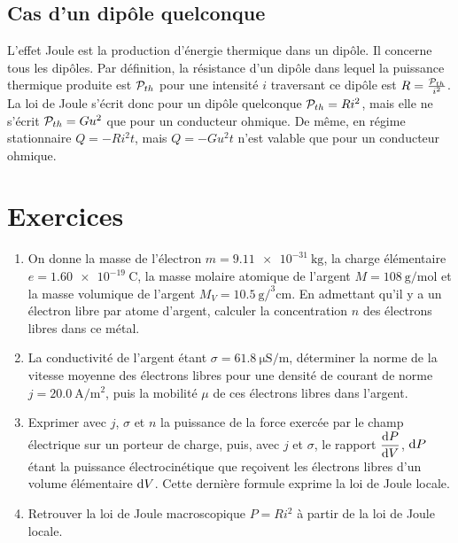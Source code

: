 \subsection{Cas d'un dipôle quelconque}

L'effet Joule est la production d'énergie thermique dans un dipôle. Il concerne tous les dipôles. Par définition, la résistance d'un dipôle dans lequel la puissance thermique produite est $\P_{th}$ pour une intensité $i$ traversant ce dipôle est $R = \frac{\P_{th}}{i^2}$. La loi de Joule s'écrit donc pour un dipôle quelconque $\P_{th} = Ri^2$, mais elle ne s'écrit $\P_{th} = Gu^2$ que pour un conducteur ohmique. De même, en régime stationnaire $Q = -Ri^2 t$, mais $Q=-Gu^2t$ n'est valable que pour un conducteur ohmique.

\section{Exercices}
\begin{exercice}
	\begin{enumerate}
		\item On donne la masse de l'électron $m=\SI{9.11e-31}{\kilogram}$, la charge élémentaire $e = \SI{1.60e-19}{\coulomb}$, la masse molaire atomique de l'argent $M=\SI{108}{\gram\per\mole}$ et la masse volumique de l'argent $M_V = \SI{10.5}{\gram\per\cubed\centi\meter}$. En admettant qu'il y a un électron libre par atome d'argent, calculer la concentration $n$ des électrons libres dans ce métal.
		\item La conductivité de l'argent étant $\sigma = \SI{61.8}{\micro\siemens\per\meter}$, déterminer la norme de la vitesse moyenne des électrons libres pour une densité de courant de norme $j=\SI{20.0}{\ampere\per\meter\squared}$, puis la mobilité $\mu$ de ces électrons libres dans l'argent.
		\item Exprimer avec $j$, $\sigma$ et $n$ la puissance de la force exercée par le champ électrique sur un porteur de charge, puis, avec $j$ et $\sigma$, le rapport $\derived{P}{V}$, $\D P$ étant la puissance électrocinétique que reçoivent les électrons libres d'un volume élémentaire $\D V$. Cette dernière formule exprime la loi de Joule locale.
		\item Retrouver la loi de Joule macroscopique $P=Ri^2$ à partir de la loi de Joule locale.
	\end{enumerate}
\end{exercice}

